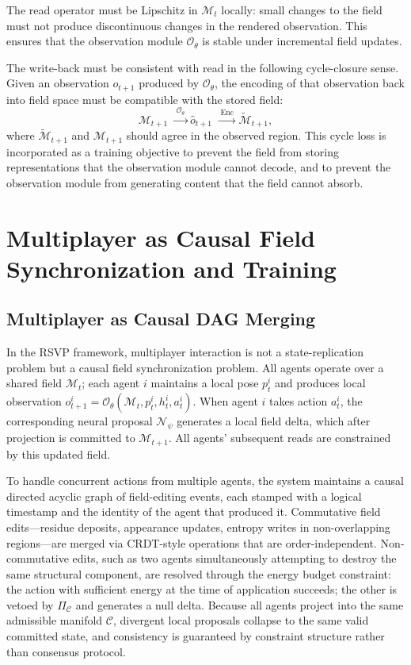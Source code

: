 \documentclass[11pt]{article}
\begin{document}
The read operator must be Lipschitz in $\mathcal{M}_t$ locally: small
changes to the field must not produce discontinuous changes in the
rendered observation.
This ensures that the observation module $\mathcal{O}_\theta$ is
stable under incremental field updates.

The write-back must be consistent with read in the following cycle-closure
sense.
Given an observation $o_{t+1}$ produced by $\mathcal{O}_\theta$, the
encoding of that observation back into field space must be compatible with
the stored field:
\[
\mathcal{M}_{t+1}
\;\xrightarrow{\;\mathcal{O}_\theta\;}
\hat{o}_{t+1}
\;\xrightarrow{\;\mathrm{Enc}\;}
\widetilde{\mathcal{M}}_{t+1},
\]
where $\widetilde{\mathcal{M}}_{t+1}$ and $\mathcal{M}_{t+1}$ should
agree in the observed region.
This cycle loss is incorporated as a training objective to prevent the
field from storing representations that the observation module cannot
decode, and to prevent the observation module from generating content
that the field cannot absorb.

\section{Multiplayer as Causal Field Synchronization and Training}
\label{sec:multiplayer}

\subsection{Multiplayer as Causal DAG Merging}

In the RSVP framework, multiplayer interaction is not a state-replication
problem but a causal field synchronization problem.
All agents operate over a shared field $\mathcal{M}_t$; each agent $i$
maintains a local pose $p_t^i$ and produces local observation
$o_{t+1}^i = \mathcal{O}_\theta(\mathcal{M}_t, p_t^i, h_t^i, a_t^i)$.
When agent $i$ takes action $a_t^i$, the corresponding neural proposal
$\mathcal{N}_\psi$ generates a local field delta, which after projection
is committed to $\mathcal{M}_{t+1}$.
All agents' subsequent reads are constrained by this updated field.

To handle concurrent actions from multiple agents, the system maintains a
causal directed acyclic graph of field-editing events, each stamped with
a logical timestamp and the identity of the agent that produced it.
Commutative field edits---residue deposits, appearance updates, entropy
writes in non-overlapping regions---are merged via CRDT-style operations
that are order-independent.
Non-commutative edits, such as two agents simultaneously attempting to
destroy the same structural component, are resolved through the energy
budget constraint: the action with sufficient energy at the time of
application succeeds; the other is vetoed by $\Pi_{\mathcal{C}}$ and
generates a null delta.
Because all agents project into the same admissible manifold $\mathcal{C}$,
divergent local proposals collapse to the same valid committed state,
and consistency is guaranteed by constraint structure rather than
consensus protocol.
\end{document}
